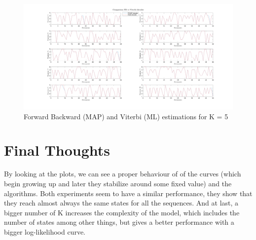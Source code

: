 \documentclass[12pt]{article}
\begin{document}
\begin{figure}[h]
	\centering
	\includegraphics[width=\textwidth]{images/comparison_FB_Viterbi_K_5.png}
	\caption{Forward Backward (MAP) and Viterbi (ML) estimations for K = 5}
	\label{fig:viterbi_5}
\end{figure}

\section{Final Thoughts}
By looking at the plots, we can see a proper behaviour of of the curves (which begin growing up and later they stabilize around some fixed value) and the algorithms. Both experiments seem to have a similar performance, they show that they reach almost always the same states for all the sequences. And at last, a bigger number of K increases the complexity of the model, which includes the number of states among other things, but gives a better performance with a bigger log-likelihood curve.


\nocite{*}
\printbibliography
\end{document}
